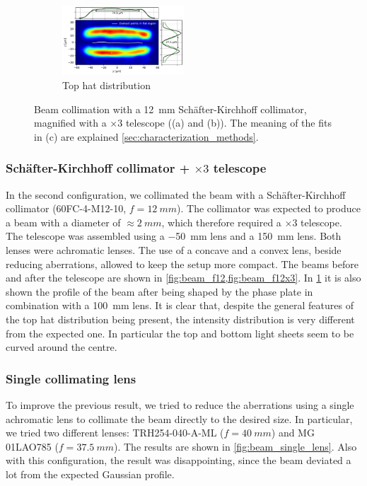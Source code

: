 \begin{figure}[p]
\begin{subfigure}{0.5\textwidth}
    \end{subfigure}
    \\
    \hfill
    \begin{subfigure}{\textwidth}
        \centering
        \includegraphics[width=0.5\textwidth]{chapters/chapter_3/figures/tophat_f12x3.pdf}
        \caption{Top hat distribution}
        \label{fig:tophat_f12x3}
    \end{subfigure}
    \hfill
    \caption{Beam collimation with a \SI{12}{mm} Schäfter-Kirchhoff collimator, magnified with a $\times3$ telescope ((a) and (b)).  The meaning of the fits in (c) are explained \cref{sec:characterization_methods}.}
    \label{fig:f12mm}
\end{figure}

\subsubsection{Schäfter-Kirchhoff collimator + $\times 3$ telescope}
In the second configuration, we collimated the beam with a Schäfter-Kirchhoff collimator (60FC-4-M12-10, $f=\SI{12}{mm}$). The collimator was expected to produce a beam with a diameter of $\approx \SI{2}{mm}$, which therefore required a $\times3$ telescope. The telescope was assembled using a \SI{-50}{mm} lens and a \SI{150}{mm} lens. Both lenses were achromatic lenses. The use of a concave and a convex lens, beside reducing aberrations, allowed to keep the setup more compact. The beams before and after the telescope are shown in \cref{fig:beam_f12,fig:beam_f12x3}.
In \cref{fig:tophat_f12x3} it is also shown the profile of the beam after being shaped by the phase plate in combination with a \SI{100}{mm} lens. It is clear that, despite the general features of the top hat distribution being present, the intensity distribution is very different from the expected one. In particular the top and bottom light sheets seem to be curved around the centre.

\subsubsection{Single collimating lens}
To improve the previous result, we tried to reduce the aberrations using a single achromatic lens to collimate the beam directly to the desired size. In particular, we tried two different lenses: TRH254-040-A-ML ($f=\SI{40}{mm}$) and MG 01LAO785 ($f=\SI{37.5}{mm}$). The results are shown in \cref{fig:beam_single_lens}. Also with this configuration, the result was disappointing, since the beam deviated a lot from the expected Gaussian profile.

